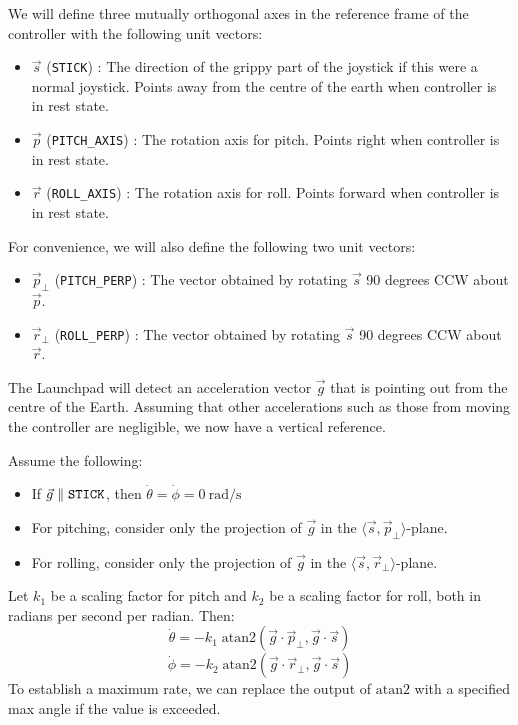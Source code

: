 \documentclass[12pt]{article}
\begin{document}
	We will define three mutually orthogonal axes in the reference frame of the controller with the following unit vectors:
	\begin{itemize}
		\item $\vec{s}$ (\verb|STICK|) : The direction of the grippy part of the joystick if this were a normal joystick. Points away from the centre of the earth when controller is in rest state.
		\item $\vec{p}$ (\verb|PITCH_AXIS|) : The rotation axis for pitch. Points right when controller is in rest state.
		\item $\vec{r}$ (\verb|ROLL_AXIS|) : The rotation axis for roll. Points forward when controller is in rest state.
	\end{itemize}
	For convenience, we will also define the following two unit vectors:
	\begin{itemize}
		\item $\vec{p}_\perp$ (\verb|PITCH_PERP|) : The vector obtained by rotating $\vec{s}$ 90 degrees CCW about $\vec{p}$.
		\item $\vec{r}_\perp$ (\verb|ROLL_PERP|) :  The vector obtained by rotating $\vec{s}$ 90 degrees CCW about $\vec{r}$.
	\end{itemize}
	
	The Launchpad will detect an acceleration vector $\vec{g}$ that is pointing out from the centre of the Earth. 
	Assuming that other accelerations such as those from moving the controller are negligible, we now have a vertical reference. 
	
	Assume the following:
	\begin{itemize}
		\item If $\vec{g} \parallel \verb|STICK|$, then $\dot{\theta} = \dot{\phi} = \SI{0}{\radian\per\second}$
		\item For pitching, consider only the projection of $\vec{g}$ in the $\langle \vec{s}, \vec{p}_\perp \rangle$-plane.
		\item For rolling, consider only the projection of $\vec{g}$ in the $\langle \vec{s}, \vec{r}_\perp \rangle$-plane.
	\end{itemize}
	Let $k_1$ be a scaling factor for pitch and $k_2$ be a scaling factor for roll, both in radians per second per radian. Then:
		$$\dot{\theta} = -k_1\;\text{atan2}(\vec{g} \cdot \vec{p}_\perp, \vec{g} \cdot \vec{s})$$
		$$\dot{\phi} = -k_2\;\text{atan2}(\vec{g} \cdot \vec{r}_\perp, \vec{g} \cdot \vec{s})$$
	To establish a maximum rate, we can replace the output of $\text{atan2}$ with a specified max angle if the value is exceeded.
	
\end{document}
